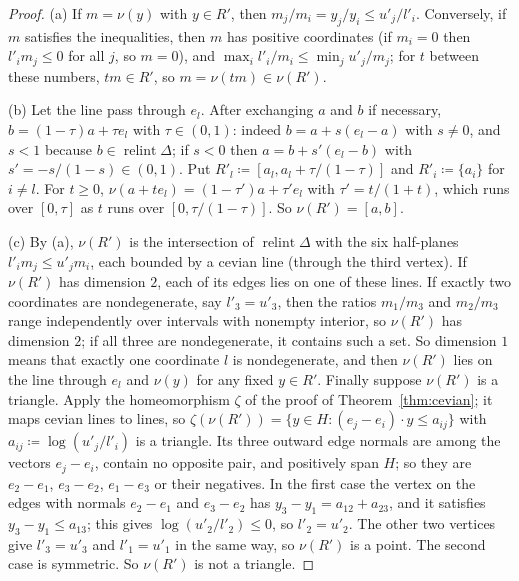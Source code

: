 \documentclass[11pt]{article}
\DeclareMathOperator{\relint}{relint}
\theoremstyle{plain}
\theoremstyle{definition}
\theoremstyle{remark}
\begin{document}
\begin{proof}
(a) If $m=\nu(y)$ with $y\in R'$, then $m_j/m_i=y_j/y_i\le u'_j/l'_i$. Conversely, if $m$
satisfies the inequalities, then $m$ has positive coordinates (if $m_i=0$ then $l'_im_j\le
0$ for all $j$, so $m=0$), and $\max_il'_i/m_i\le\min_ju'_j/m_j$; for $t$ between these
numbers, $tm\in R'$, so $m=\nu(tm)\in\nu(R')$.

(b) Let the line pass through $e_l$. After exchanging $a$ and $b$ if necessary,
$b=(1-\tau)a+\tau e_l$ with $\tau\in(0,1)$: indeed $b=a+s(e_l-a)$ with $s\ne0$, and $s<1$
because $b\in\relint\Delta$; if $s<0$ then $a=b+s'(e_l-b)$ with $s'=-s/(1-s)\in(0,1)$.
Put $R'_l\coloneqq[a_l,a_l+\tau/(1-\tau)]$ and $R'_i\coloneqq\{a_i\}$ for $i\ne l$. For
$t\ge0$, $\nu(a+te_l)=(1-\tau')a+\tau'e_l$ with $\tau'=t/(1+t)$, which runs over $[0,\tau]$
as $t$ runs over $[0,\tau/(1-\tau)]$. So $\nu(R')=[a,b]$.

(c) By (a), $\nu(R')$ is the intersection of $\relint\Delta$ with the six half-planes
$l'_im_j\le u'_jm_i$, each bounded by a cevian line (through the third vertex). If
$\nu(R')$ has dimension $2$, each of its edges lies on one of these lines. If exactly two
coordinates are nondegenerate, say $l'_3=u'_3$, then the ratios $m_1/m_3$ and $m_2/m_3$
range independently over intervals with nonempty interior, so $\nu(R')$ has dimension $2$;
if all three are nondegenerate, it contains such a set. So dimension $1$ means that
exactly one coordinate $l$ is nondegenerate, and then $\nu(R')$ lies on the line through
$e_l$ and $\nu(y)$ for any fixed $y\in R'$. Finally suppose $\nu(R')$ is a triangle. Apply
the homeomorphism $\zeta$ of the proof of Theorem~\ref{thm:cevian}; it maps cevian lines
to lines, so $\zeta(\nu(R'))=\{y\in H:(e_j-e_i)\cdot y\le a_{ij}\}$ with $a_{ij}\coloneqq
\log(u'_j/l'_i)$ is a triangle. Its three outward edge normals are among the vectors
$e_j-e_i$, contain no opposite pair, and positively span $H$; so they are $e_2-e_1$,
$e_3-e_2$, $e_1-e_3$ or their negatives. In the first case the vertex on the edges with
normals $e_2-e_1$ and $e_3-e_2$ has $y_3-y_1=a_{12}+a_{23}$, and it satisfies $y_3-y_1\le
a_{13}$; this gives $\log(u'_2/l'_2)\le0$, so $l'_2=u'_2$. The other two vertices give
$l'_3=u'_3$ and $l'_1=u'_1$ in the same way, so $\nu(R')$ is a point. The second case is
symmetric. So $\nu(R')$ is not a triangle.
\end{proof}
\end{document}
